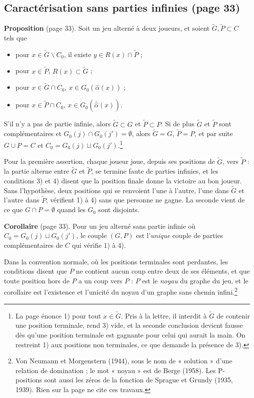 \documentclass[11pt,a4paper]{article}
\begin{document}
\subsection*{Caractérisation sans parties infinies (page 33)}

\textbf{Proposition} (page 33). Soit un jeu alterné à deux joueurs, et soient
$\widetilde{G}, \widetilde{P} \subset C$ tels que
\begin{itemize}
  \item[1)] pour $x \in \widetilde{G} \smallsetminus C_0$, il existe
  $y \in R(x) \cap \widetilde{P}$ ;
  \item[2)] pour $x \in \widetilde{P}$, $R(x) \subset \widetilde{G}$ ;
  \item[3)] pour $x \in \widetilde{G} \cap C_0$, $x \in G_0(\hat\alpha(x))$ ;
  \item[4)] pour $x \in \widetilde{P} \cap C_0$,
  $x \in G_0(\bar{\hat\alpha}(x))$.
\end{itemize}
S'il n'y a pas de partie infinie, alors $\widetilde{G} \subset G$ et
$\widetilde{P} \subset P$. Si de plus $\widetilde{G}$ et $\widetilde{P}$ sont
complémentaires et $G_0(j) \cap G_0(j') = \emptyset$, alors
$\widetilde{G} = G$, $\widetilde{P} = P$, et par suite $G \cup P = C$ et
$C_0 = G_0(j) \sqcup G_0(j')$.\footnote{La page énonce 1) pour tout
$x \in \widetilde{G}$. Pris à la lettre, il interdit à $\widetilde{G}$ de
contenir une position terminale, rend 3) vide, et la seconde conclusion
devient fausse dès qu'une position terminale est gagnante pour celui qui
aurait la main. On restreint 1) aux positions non terminales, ce que demande
la présence de 3).}

Pour la première assertion, chaque joueur joue, depuis ses positions de
$\widetilde{G}$, vers $\widetilde{P}$ : la partie alterne entre
$\widetilde{G}$ et $\widetilde{P}$, se termine faute de parties infinies, et
les conditions 3) et 4) disent que la position finale donne la victoire au
bon joueur. Sans l'hypothèse, deux positions qui se renvoient l'une à l'autre,
l'une dans $\widetilde{G}$ et l'autre dans $\widetilde{P}$, vérifient 1) à 4)
sans que personne ne gagne. La seconde vient de ce que $G \cap P = \emptyset$
quand les $G_0$ sont disjoints.

\textbf{Corollaire} (page 33). Pour un jeu alterné sans partie infinie où
$C_0 = G_0(j) \sqcup G_0(j')$, le couple $(G, P)$ est l'\emph{unique} couple
de parties complémentaires de $C$ qui vérifie 1) à 4).

Dans la convention normale, où les positions terminales sont perdantes, les
conditions disent que $P$ ne contient aucun coup entre deux de ses éléments,
et que toute position hors de $P$ a un coup vers $P$ : $P$ est le
\emph{noyau} du graphe du jeu, et le corollaire est l'existence et l'unicité
du noyau d'un graphe sans chemin infini.\footnote{Von Neumann et Morgenstern
(1944), sous le nom de « solution » d'une relation de domination ; le mot
« noyau » est de Berge (1958). Les P-positions sont aussi les zéros de la
fonction de Sprague et Grundy (1935, 1939). Rien sur la page ne cite ces
travaux.}
\end{document}
